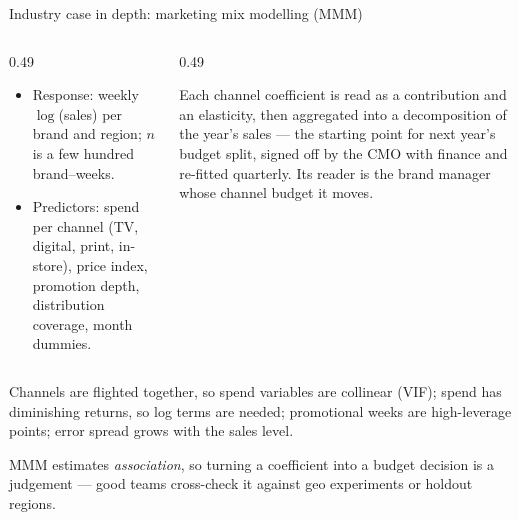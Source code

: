 \documentclass[aspectratio=169,11pt]{beamer}
\begin{document}
\begin{frame}{Industry case in depth: marketing mix modelling (MMM)}
  \footnotesize
  \begin{columns}[T]
    \begin{column}{0.49\textwidth}
      \begin{industry}
        \begin{itemize}\setlength{\itemsep}{0pt}
          \item Response: weekly $\log$(sales) per brand and region;
                $n$ is a few hundred brand--weeks.
          \item Predictors: spend per channel (TV, digital, print,
                in-store), price index, promotion depth, distribution
                coverage, month dummies.
        \end{itemize}
      \end{industry}
    \end{column}
    \begin{column}{0.49\textwidth}
      \begin{readme}
        Each channel coefficient is read as a contribution and an
        elasticity, then aggregated into a decomposition of the year's
        sales --- the starting point for next year's budget split,
        signed off by the CMO with finance and re-fitted quarterly.
        Its reader is the brand manager whose channel budget it moves.
      \end{readme}
    \end{column}
  \end{columns}
  \vspace{-1mm}
  \begin{industry}
    Channels are flighted together, so spend variables are collinear (VIF);
    spend has diminishing returns, so log terms are needed; promotional weeks
    are high-leverage points; error spread grows with the sales level.
  \end{industry}
  \vspace{-2mm}
  \begin{takeaway}
    MMM estimates \emph{association}, so turning a coefficient
    into a budget decision is a judgement --- good teams cross-check it
    against geo experiments or holdout regions.
  \end{takeaway}
\end{frame}
\end{document}
